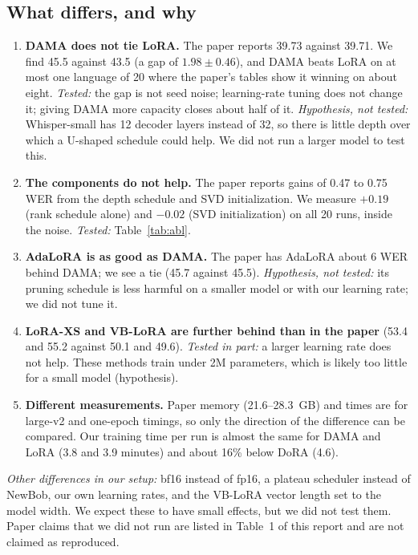 \documentclass[11pt,a4paper]{article}
\begin{document}
\subsection{What differs, and why}
\begin{enumerate}
\item \textbf{DAMA does not tie LoRA.} The paper reports 39.73 against 39.71. We find 45.5 against 43.5 (a gap of $1.98\pm0.46$), and DAMA beats LoRA on at most one language of 20 where the paper's tables show it winning on about eight. \emph{Tested:} the gap is not seed noise; learning-rate tuning does not change it; giving DAMA more capacity closes about half of it. \emph{Hypothesis, not tested:} Whisper-small has 12 decoder layers instead of 32, so there is little depth over which a U-shaped schedule could help. We did not run a larger model to test this.
\item \textbf{The components do not help.} The paper reports gains of 0.47 to 0.75 WER from the depth schedule and SVD initialization. We measure $+0.19$ (rank schedule alone) and $-0.02$ (SVD initialization) on all 20 runs, inside the noise. \emph{Tested:} Table~\ref{tab:abl}.
\item \textbf{AdaLoRA is as good as DAMA.} The paper has AdaLoRA about 6 WER behind DAMA; we see a tie (45.7 against 45.5). \emph{Hypothesis, not tested:} its pruning schedule is less harmful on a smaller model or with our learning rate; we did not tune it.
\item \textbf{LoRA-XS and VB-LoRA are further behind than in the paper} (53.4 and 55.2 against 50.1 and 49.6). \emph{Tested in part:} a larger learning rate does not help. These methods train under 2M parameters, which is likely too little for a small model (hypothesis).
\item \textbf{Different measurements.} Paper memory (21.6--28.3~GB) and times are for large-v2 and one-epoch timings, so only the direction of the difference can be compared. Our training time per run is almost the same for DAMA and LoRA (3.8 and 3.9 minutes) and about 16\% below DoRA (4.6).
\end{enumerate}
\emph{Other differences in our setup:} bf16 instead of fp16, a plateau scheduler instead of NewBob, our own learning rates, and the VB-LoRA vector length set to the model width. We expect these to have small effects, but we did not test them. Paper claims that we did not run are listed in Table~1 of this report and are not claimed as reproduced.

\end{document}
